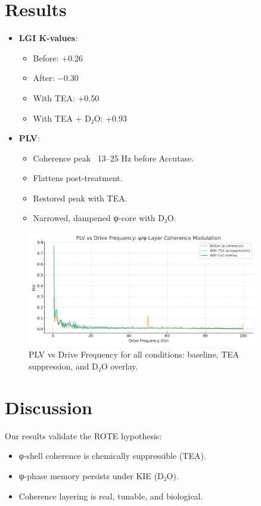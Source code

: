\documentclass[12pt]{article}
\begin{document}
\section*{Results}
\begin{itemize}
  \item \textbf{LGI K-values}:
    \begin{itemize}
      \item Before: +0.26
      \item After: −0.30
      \item With TEA: +0.50
      \item With TEA + D₂O: +0.93
    \end{itemize}
  \item \textbf{PLV}:
    \begin{itemize}
      \item Coherence peak ~13–25 Hz before Accutase.
      \item Flattens post-treatment.
      \item Restored peak with TEA.
      \item Narrowed, dampened ψ-core with D₂O.
    \end{itemize}
\end{itemize}

\begin{figure}[h!]
\centering
\includegraphics[width=0.9\textwidth]{ROTE_Kv_PLV_TEAD2O.png}
\caption{PLV vs Drive Frequency for all conditions: baseline, TEA suppression, and D₂O overlay.}
\end{figure}

\section*{Discussion}
Our results validate the ROTE hypothesis:
\begin{itemize}
  \item φ-shell coherence is chemically suppressible (TEA).
  \item ψ-phase memory persists under KIE (D₂O).
  \item Coherence layering is real, tunable, and biological.
\end{itemize}
\end{document}
